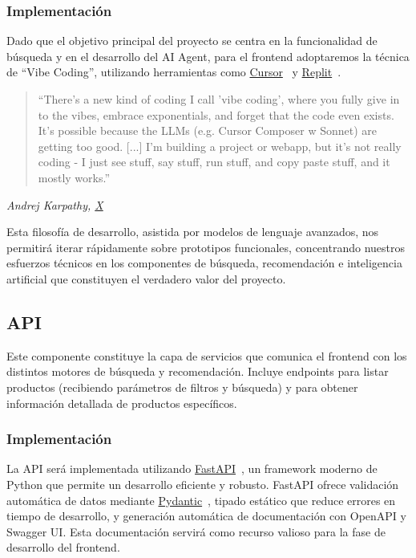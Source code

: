 \documentclass[12pt]{article}
\begin{document}
\subsubsection{Implementación}

Dado que el objetivo principal del proyecto se centra en la funcionalidad de búsqueda y en el desarrollo del AI Agent, para el frontend adoptaremos la técnica de ``Vibe Coding'', utilizando herramientas como \href{https://www.cursor.com}{Cursor}~\cite{Cursor} y \href{https://replit.com}{Replit}~\cite{Replit}.

\begin{quote}
    ``There's a new kind of coding I call 'vibe coding', where you fully give in to the vibes, embrace exponentials, and forget that the code even exists. It's possible because the LLMs (e.g. Cursor Composer w Sonnet) are getting too good. [...] I'm building a project or webapp, but it's not really coding - I just see stuff, say stuff, run stuff, and copy paste stuff, and it mostly works.''
\end{quote}

\textit{Andrej Karpathy, \href{https://x.com/karpathy/status/1886192184808149383}{X}}~\cite{Karpathy}

\vspace{0.5cm}

Esta filosofía de desarrollo, asistida por modelos de lenguaje avanzados, nos permitirá iterar rápidamente sobre prototipos funcionales, concentrando nuestros esfuerzos técnicos en los componentes de búsqueda, recomendación e inteligencia artificial que constituyen el verdadero valor del proyecto.

\subsection{API}

Este componente constituye la capa de servicios que comunica el frontend con los distintos motores de búsqueda y recomendación. Incluye endpoints para listar productos (recibiendo parámetros de filtros y búsqueda) y para obtener información detallada de productos específicos.

\subsubsection{Implementación}

La API será implementada utilizando \href{https://fastapi.tiangolo.com/}{FastAPI}~\cite{FastAPI}, un framework moderno de Python que permite un desarrollo eficiente y robusto. FastAPI ofrece validación automática de datos mediante \href{https://docs.pydantic.dev/latest/}{Pydantic}~\cite{Pydantic}, tipado estático que reduce errores en tiempo de desarrollo, y generación automática de documentación con OpenAPI y Swagger UI. Esta documentación servirá como recurso valioso para la fase de desarrollo del frontend.
\end{document}
